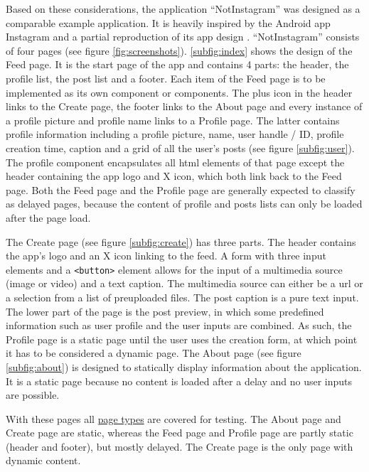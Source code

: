 \documentclass[a4paper, 12pt]{article}
\begin{document}
Based on these considerations, the application \enquote{NotInstagram} was designed as a comparable example application.
It is heavily inspired by the Android app Instagram and a partial reproduction of its app design \citep{instagram}.
\enquote{NotInstagram} consists of four pages (see figure \ref{fig:screenshots}).
\ref{subfig:index} shows the design of the Feed page.
It is the start page of the app and contains 4 parts: the header, the profile list, the post list and a footer.
Each item of the Feed page is to be implemented as its own component or components.
The plus icon in the header links to the Create page, the footer links to the About page and every instance of a profile picture and profile name links to a Profile page.
The latter contains profile information including a profile picture, name, user handle / ID, profile creation time, caption and a grid of all the user's posts (see figure \ref{subfig:user}).
The profile component encapsulates all \acrshort{html} elements of that page except the header containing the app logo and X icon, which both link back to the Feed page.
Both the Feed page and the Profile page are generally expected to classify as delayed pages, because the content of profile and posts lists can only be loaded after the page load.

The Create page (see figure \ref{subfig:create}) has three parts.
The header contains the app's logo and an X icon linking to the feed.
A form with three input elements and a \verb|<button>| element allows for the input of a multimedia source (image or video) and a text caption.
The multimedia source can either be a \acrshort{url} or a selection from a list of preuploaded files.
The post caption is a pure text input.
The lower part of the page is the post preview, in which some predefined information such as user profile and the user inputs are combined.
As such, the Profile page is a static page until the user uses the creation form, at which point it has to be considered a dynamic page.
The About page (see figure \ref{subfig:about}) is designed to statically display information about the application.
It is a static page because no content is loaded after a delay and no user inputs are possible.

With these pages all \hyperref[enum:pagetypes]{page types} are covered for testing.
The About page and Create page are static, whereas the Feed page and Profile page are partly static (header and footer), but mostly delayed.
The Create page is the only page with dynamic content.
\end{document}
